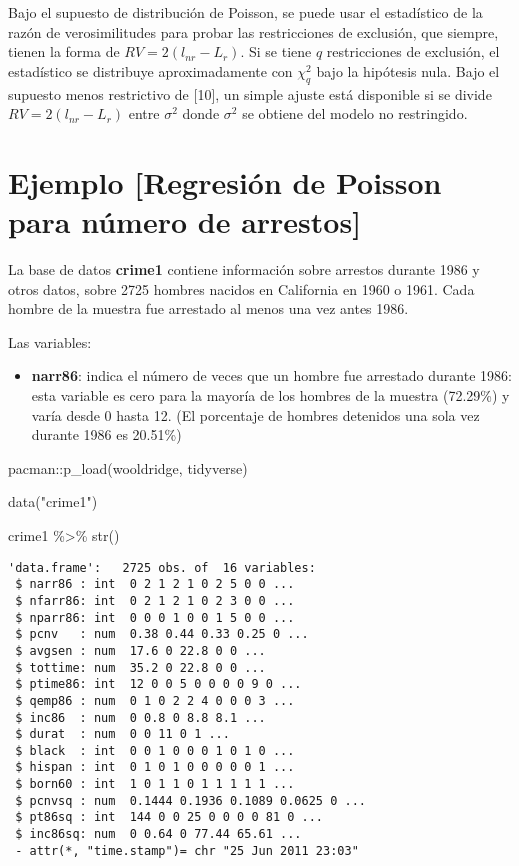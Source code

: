 \documentclass[
  letterpaper,
  DIV=11,
  numbers=noendperiod]{scrreprt}
\newenvironment{Shaded}{\begin{snugshade}}{\end{snugshade}}
\newcommand{\FunctionTok}[1]{\textcolor[rgb]{0.28,0.35,0.67}{#1}}
\newcommand{\NormalTok}[1]{\textcolor[rgb]{0.00,0.23,0.31}{#1}}
\newcommand{\SpecialCharTok}[1]{\textcolor[rgb]{0.37,0.37,0.37}{#1}}
\newcommand{\StringTok}[1]{\textcolor[rgb]{0.13,0.47,0.30}{#1}}
\providecommand{\tightlist}{%
  \setlength{\itemsep}{0pt}\setlength{\parskip}{0pt}}\usepackage{longtable,booktabs,array}
\begin{document}
Bajo el supuesto de distribución de Poisson, se puede usar el
estadístico de la razón de verosimilitudes para probar las restricciones
de exclusión, que siempre, tienen la forma de \(RV=2(l_{nr}-L_r)\). Si
se tiene \(q\) restricciones de exclusión, el estadístico se distribuye
aproximadamente con \(\chi^2_q\) bajo la hipótesis nula. Bajo el
supuesto menos restrictivo de {[}10{]}, un simple ajuste está disponible
si se divide \(RV=2(l_{nr}-L_r)\) entre \(\sigma^2\) donde \(\sigma^2\)
se obtiene del modelo no restringido.

\section{Ejemplo {[}Regresión de Poisson para número de
arrestos{]}}\label{ejemplo-regresiuxf3n-de-poisson-para-nuxfamero-de-arrestos}

La base de datos \textbf{crime1} contiene información sobre arrestos
durante 1986 y otros datos, sobre 2725 hombres nacidos en California en
1960 o 1961. Cada hombre de la muestra fue arrestado al menos una vez
antes 1986.

Las variables:

\begin{itemize}
\tightlist
\item
  \textbf{narr86}: indica el número de veces que un hombre fue arrestado
  durante 1986: esta variable es cero para la mayoría de los hombres de
  la muestra (72.29\%) y varía desde 0 hasta 12. (El porcentaje de
  hombres detenidos una sola vez durante 1986 es 20.51\%)
\end{itemize}

\begin{Shaded}
\begin{Highlighting}[]
\NormalTok{pacman}\SpecialCharTok{::}\FunctionTok{p\_load}\NormalTok{(wooldridge, }
\NormalTok{               tidyverse)}

\FunctionTok{data}\NormalTok{(}\StringTok{"crime1"}\NormalTok{)}

\NormalTok{crime1 }\SpecialCharTok{\%\textgreater{}\%} 
\FunctionTok{str}\NormalTok{()}
\end{Highlighting}
\end{Shaded}

\begin{verbatim}
'data.frame':   2725 obs. of  16 variables:
 $ narr86 : int  0 2 1 2 1 0 2 5 0 0 ...
 $ nfarr86: int  0 2 1 2 1 0 2 3 0 0 ...
 $ nparr86: int  0 0 0 1 0 0 1 5 0 0 ...
 $ pcnv   : num  0.38 0.44 0.33 0.25 0 ...
 $ avgsen : num  17.6 0 22.8 0 0 ...
 $ tottime: num  35.2 0 22.8 0 0 ...
 $ ptime86: int  12 0 0 5 0 0 0 0 9 0 ...
 $ qemp86 : num  0 1 0 2 2 4 0 0 0 3 ...
 $ inc86  : num  0 0.8 0 8.8 8.1 ...
 $ durat  : num  0 0 11 0 1 ...
 $ black  : int  0 0 1 0 0 0 1 0 1 0 ...
 $ hispan : int  0 1 0 1 0 0 0 0 0 1 ...
 $ born60 : int  1 0 1 1 0 1 1 1 1 1 ...
 $ pcnvsq : num  0.1444 0.1936 0.1089 0.0625 0 ...
 $ pt86sq : int  144 0 0 25 0 0 0 0 81 0 ...
 $ inc86sq: num  0 0.64 0 77.44 65.61 ...
 - attr(*, "time.stamp")= chr "25 Jun 2011 23:03"
\end{verbatim}
\end{document}
